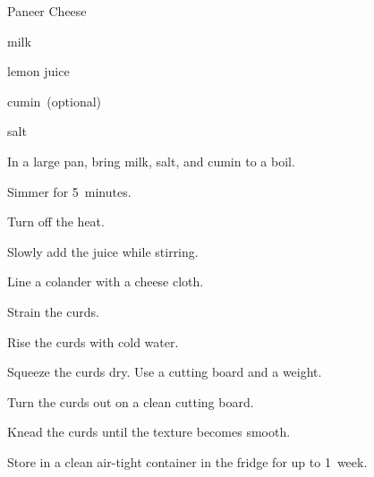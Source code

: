 \begin{recipe}{Paneer Cheese}{}{}

\begin{ingredients}
\item {} milk
\item \C{\quarter} lemon juice
\item {} cumin~(optional)
\item {} salt
\end{ingredients}

\begin{directions}
\item In a large pan, bring milk, salt, and cumin to a boil.
\item Simmer for 5~minutes.
\item Turn off the heat.
\item Slowly add the juice while stirring.
\item Line a colander with a cheese cloth.
\item Strain the curds.
\item Rise the curds with cold water.
\item Squeeze the curds dry. Use a cutting board and a weight.
\item Turn the curds out on a clean cutting board.
\item Knead the curds until the texture becomes smooth.
\item Store in a clean air-tight container in the fridge for up to 1~week.
\end{directions}

\end{recipe}
